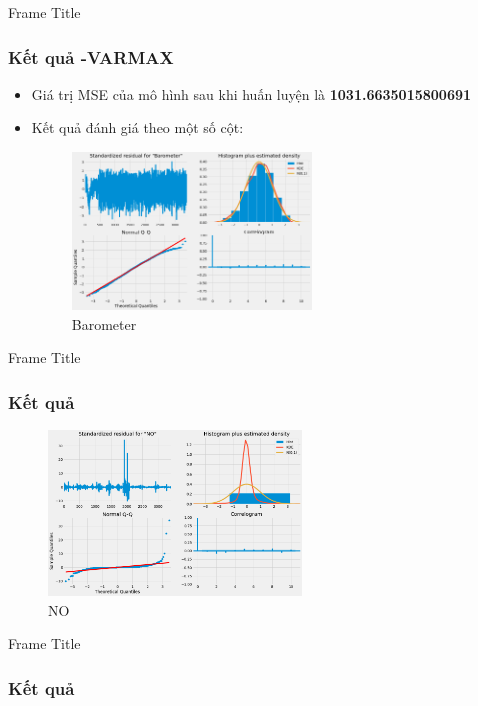 \documentclass[notheorems,hyperref={bookmarks=true}]{beamer}
\theoremstyle{plain}
\numberwithin{equation}{section}
\begin{document}
\begin{footnotesize}
\begin{frame}{Frame Title}
	\frametitle{Kết quả -VARMAX}
 \begin{itemize}
     \item Giá trị MSE của mô hình sau khi huấn luyện là \textbf{1031.6635015800691} 
    \item Kết quả đánh giá theo một số cột:
    \begin{figure}[H]
        \centering
        \includegraphics[width=0.6\textwidth]{figures/danhgia1.png}
        \caption[Barometer]{Barometer}
    \end{figure}
    \end{itemize}
	\end{frame}

  \begin{frame}{Frame Title}
	\frametitle{Kết quả }
 
    \begin{figure}[H]
        \centering
        \includegraphics[width=0.6\textwidth]{figures/danhgia3.png}
        \caption[NO]{NO}
    \end{figure}
	\end{frame}	
 \begin{frame}{Frame Title}
	\frametitle{Kết quả }
 

\end{frame}
\end{footnotesize}
\end{document}
